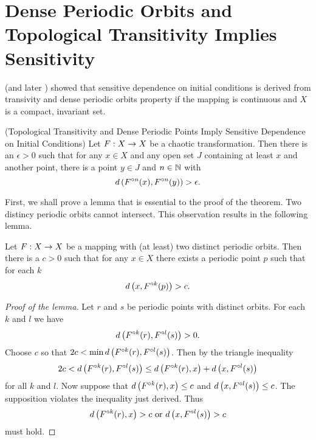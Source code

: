 \documentclass[12pt,draft,twoside]{book}
\begin{document}
\section{Dense Periodic Orbits and Topological Transitivity Implies Sensitivity}
\citet{silverman} (and later \citet{banks}) showed that sensitive dependence on initial conditions is derived from transivity and dense periodic orbits property if the mapping is continuous and $X$ is a compact, invariant set. 

  \begin{theorem}
    (Topological Transitivity and Dense Periodic Points Imply Sensitive Dependence on Initial Conditions)
    Let $F: X\rightarrow X$ be a chaotic transformation. Then there is an $\epsilon > 0$ such that
    for any $x\in X$ and any open set $J$ containing at least $x$ and another point, there is
    a point $y\in J$ and $n\in \mathbb{N}$ with
    \begin{equation*}
      d\left( F^{\circ n}(x),F^{\circ n}(y) \right) > \epsilon.
    \end{equation*}
    \label{thm:banks}
  \end{theorem}
  First, we shall prove a lemma that is essential to the proof of the theorem.
  Two distincy periodic orbits cannot intersect.
  This observation results in the following lemma.
  \begin{lemma}
    Let $F: X\rightarrow X$ be a mapping with (at least) two distinct periodic orbits.
    Then there is a $c > 0$ such that for any $x\in X$ there exists a periodic
    point $p$ such that for each $k$
    \begin{equation*}
      d\left( x, F^{\circ k}(p) \right) > c.
    \end{equation*}
    \label{lem:dev1}
  \begin{proof}[Proof of the lemma]
    Let $r$ and $s$ be periodic points with distinct orbits. For each $k$ and $l$ we have
    \begin{equation*}
      d\left( F^{\circ k}(r), F^{\circ l}(s) \right) > 0.
    \end{equation*}
    Choose $c$ so that $2c < \min d\left( F^{\circ k}(r),F^{\circ l}(s) \right)$.
    Then by the triangle inequality
    \begin{equation*}
      2c < d\left( F^{\circ k}(r),F^{\circ l}(s) \right) \leq d\left( F^{\circ k}(r),x \right) + d\left( x,F^{\circ l}(s) \right)
    \end{equation*}
    for all $k$ and $l$.
    Now suppose that $d\left( F^{\circ k}(r),x \right) \leq c$ and $d\left( x,F^{\circ l}(s) \right) \leq c$. The supposition
    violates the inequality just derived. Thus 
    \begin{equation*}
      d\left( F^{\circ k}(r),x \right) > c \mbox{ or } d\left( x,F^{\circ l}(s) \right) > c
    \end{equation*}
    must hold.
  \end{proof}
  \end{lemma}
\end{document}
